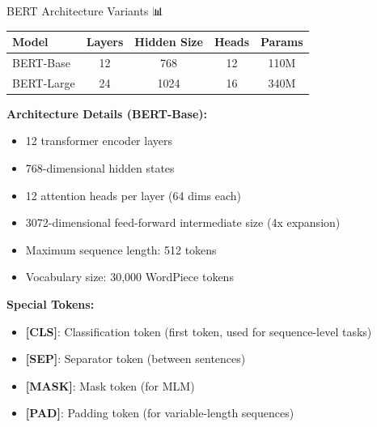 \documentclass[aspectratio=169]{beamer}
\begin{document}
\begin{frame}[shrink=10]{BERT Architecture Variants 📊}
\begin{center}
\begin{tabular}{lcccc}
\toprule
\textbf{Model} & \textbf{Layers} & \textbf{Hidden Size} & \textbf{Heads} & \textbf{Params} \\
\midrule
BERT-Base & 12 & 768 & 12 & 110M \\
BERT-Large & 24 & 1024 & 16 & 340M \\
\bottomrule
\end{tabular}
\end{center}

\vspace{1em}

\textbf{Architecture Details (BERT-Base):}
\begin{itemize}\setlength{\itemsep}{0pt}
    \item 12 transformer encoder layers
    \item 768-dimensional hidden states
    \item 12 attention heads per layer (64 dims each)
    \item 3072-dimensional feed-forward intermediate size (4x expansion)
    \item Maximum sequence length: 512 tokens
    \item Vocabulary size: 30,000 WordPiece tokens
\end{itemize}

\vspace{1em}

\textbf{Special Tokens:}
\begin{itemize}\setlength{\itemsep}{0pt}
    \item \textbf{[CLS]}: Classification token (first token, used for sequence-level tasks)
    \item \textbf{[SEP]}: Separator token (between sentences)
    \item \textbf{[MASK]}: Mask token (for MLM)
    \item \textbf{[PAD]}: Padding token (for variable-length sequences)
\end{itemize}
\end{frame}
\end{document}
